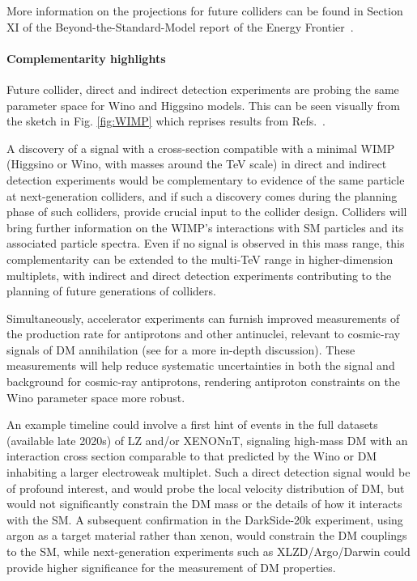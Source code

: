 \documentclass[nofootinbib]{article}
\begin{document}
More information on the projections for future colliders can be found in Section XI of the Beyond-the-Standard-Model report of the Energy Frontier~\cite{Bose:2022obr}. 

\paragraph{Complementarity highlights} 
Future collider, direct and indirect detection experiments are probing the same parameter space for Wino and Higgsino models. %
This can be seen visually from the sketch in Fig. \ref{fig:WIMP} which reprises results from Refs.~\cite{Cooley:2022ufh,Bose:2022obr}.

A discovery of a signal with a cross-section compatible with a minimal WIMP (Higgsino or Wino, with masses around the TeV scale) in direct and indirect detection experiments would be complementary to evidence of the same particle at next-generation colliders, and if such a discovery comes during the planning phase of such colliders, provide crucial input to the collider design. 
Colliders will bring further information on the WIMP’s interactions with SM particles and its associated particle spectra. 
Even if no signal is observed in this mass range, this complementarity can be extended to the multi-TeV range in higher-dimension multiplets, with indirect and direct detection experiments contributing to the planning of future generations of colliders. 

Simultaneously, accelerator experiments can furnish improved measurements of the production rate for antiprotons and other antinuclei, relevant to cosmic-ray signals of DM annihilation (see \cite{CF1WP5} for a more in-depth discussion). These measurements will help reduce systematic uncertainties in both the signal and background for cosmic-ray antiprotons, rendering antiproton constraints on the Wino parameter space more robust.

An example timeline could involve a first hint of events in the full datasets (available late 2020s) of LZ and/or XENONnT, signaling high-mass DM with an interaction cross section comparable to that predicted by the Wino or DM inhabiting a larger electroweak multiplet. Such a direct detection signal would be of profound interest, and would probe the local velocity distribution of DM, but would not significantly constrain the DM mass or the details of how it interacts with the SM. A subsequent confirmation in the DarkSide-20k experiment, using argon as a target material rather than xenon, would constrain the DM couplings to the SM, while next-generation experiments such as XLZD/Argo/Darwin could provide higher significance for the measurement of DM properties.
\end{document}
